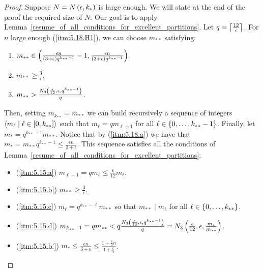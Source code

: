         \begin{proof}
            Suppose $N = N\left( \epsilon, k_* \right)$ is large enough.
            We will state at the end of the proof the required size of $N$.
            Our goal is to apply Lemma~\ref{resume_of_all_conditions_for_excellent_partitions}.
            Let $q = \left\lceil \frac{12}{\epsilon} \right\rceil$.
            For $n$ large enough (\ref{itm:5.18.H1}), we can choose $m_{**}$ satisfying:
            \begin{enumerate}[label=(\alph*), ref=\alph*]
                \item \label{itm:5.18.a} $m_{**} \in \left( \frac{\epsilon n}{\left( 3 + \epsilon \right) q^{k_{**}-1}} - 1,
                    \frac{\epsilon n}{\left( 3 + \epsilon \right) q^{k_{**}-1}} \right)$.
                \item \label{itm:5.18.b} $m_{**} \geq \frac{3}{\epsilon}$.
                \item \label{itm:5.18.c} $m_{**} > \frac{N_3\left( \frac{\epsilon}{12}, \epsilon, q^{k_{**}-1} \right)}{q}$.
            \end{enumerate}
            Then, setting $m_{k_{**}} = m_{**}$ we can build recursively a sequence of integers
            $\left< m_\ell \mid \ell \in [0, k_{**}] \right>$ such that $m_\ell = q m_{\ell + 1}$ for all
            $\ell \in \left\{ 0, \dots, k_{**}-1 \right\}$.
            Finally, let $m_* = q^{k_{**}-1} m_{**}$.
            Notice that by (\ref{itm:5.18.a}) we have that $m_* = m_{**} q^{k_{**}-1} \leq \frac{\epsilon n}{3 + \epsilon}$.
            This sequence satisfies all the conditions of Lemma~\ref{resume_of_all_conditions_for_excellent_partitions}:
            \begin{itemize}[label={}]
                \item (\ref{itm:5.15.a}) $m_{\ell-1} = q m_\ell \leq \frac{\epsilon}{12} m_\ell$.
                \item (\ref{itm:5.15.b}) $m_{**} \geq \frac{3}{\epsilon}$.
                \item (\ref{itm:5.15.c}) $m_\ell = q^{k_{**}-\ell} m_{**}$ so that $m_{**} \mid m_\ell$ for all $\ell \in \left\{ 0, \dots, k_{**} \right\}$.
                \item (\ref{itm:5.15.d}) $m_{k_{**}-1} = q m_{**} < q \frac{N_3\left( \frac{\epsilon}{12}, \epsilon, q^{k_{**}-1} \right)}{q}
                    = N_3\left( \frac{\epsilon}{12}, \epsilon, \frac{m_*}{m_{**}} \right)$.
                \item (\ref{itm:5.15.b'}) $m_* \leq \frac{\epsilon n}{3 + \epsilon} \leq \frac{1 + \frac{\epsilon}{3}n}{1 + \frac{\epsilon}{3}}$.

\end{itemize}
\end{proof}
